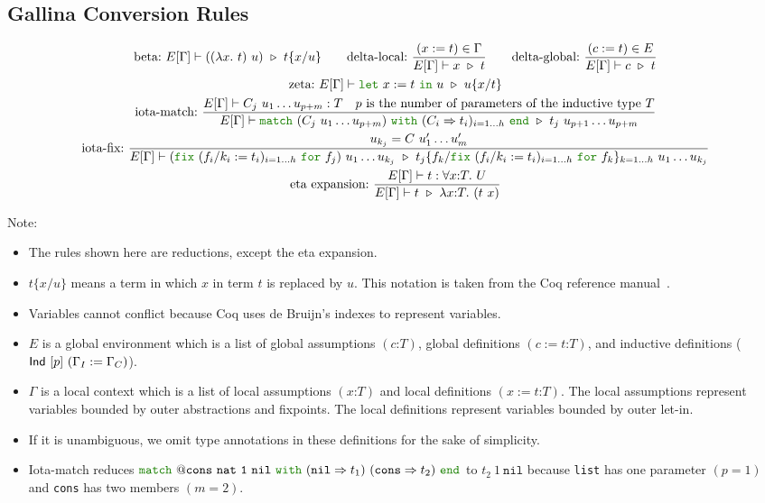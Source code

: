 \documentclass[a4paper,fleqn]{article}
\def\coq{\textrm{Coq}}
\def\gallina{\textrm{Gallina}}
\newcommand{\kwlet}{\mbox{\color{mygreen}\ttfamily let}}
\newcommand{\kwin}{\mbox{\color{mygreen}\ttfamily in}}
\newcommand{\kwmatch}{\mbox{\color{mygreen}\ttfamily match}}
\newcommand{\kwwith}{\mbox{\color{mygreen}\ttfamily with}}
\newcommand{\kwend}{\mbox{\color{mygreen}\ttfamily end}}
\newcommand{\kwfix}{\mbox{\color{mygreen}\ttfamily fix}}
\newcommand{\kwfor}{\mbox{\color{mygreen}\ttfamily for}}
\newcommand{\lam}[2]{\lambda #1.~#2}
\newcommand{\lamT}[3]{\lambda #1\mathord{:}#2.~#3}
\newcommand{\gassum}[2]{(#1\mathord{:}#2)}
\newcommand{\glodef}[3]{(#1:=#2\mathord{:}#3)}
\newcommand{\lassum}[2]{(#1\mathord{:}#2)}
\newcommand{\ldef}[3]{(#1:=#2\mathord{:}#3)}
\newcommand{\prodT}[3]{\forall #1\mathord{:}#2.~#3}
\newcommand{\letin}[3]{\kwlet~#1:=#2~\kwin~#3}
\newcommand{\match}[4]{\kwmatch~#1~\kwwith~(#2 \Rightarrow #3)_{#4}~\kwend}
\newcommand{\fix}[4]{\kwfix~(#1 := #2)_{#3}~\kwfor~#4}
\newcommand{\WT}[4]{\ensuremath{#1[#2] \vdash #3 : #4}}
\newcommand{\WTE}[3]{\WT{E}{#1}{#2}{#3}}
\newcommand{\WTEG}[2]{\WTE{\Gamma}{#1}{#2}}
\newcommand{\subst}[3]{#1\{#2/#3\}}
\begin{document}
\subsection{\gallina{} Conversion Rules}\label{sec:conversion-rules}

\begin{gather*}
  \text{beta:}~
    E[\Gamma] \vdash ((\lam{x}{t})~u)~\triangleright~\subst{t}{x}{u} \qquad
  \text{delta-local:}~
    \dfrac{(x:=t) \in \Gamma}{E[\Gamma] \vdash x~\triangleright~t} \qquad
  \text{delta-global:}~
    \dfrac{(c:=t) \in E}{E[\Gamma] \vdash c~\triangleright~t} \\
  \text{zeta:}~
    E[\Gamma] \vdash \letin{x}{t}{u}~\triangleright~\subst{u}{x}{t} \\
  \text{iota-match:}~
    \dfrac
    {
      E[\Gamma] \vdash C_j~u_1\ldots u_{p+m} : T \quad
      \text{$p$ is the number of parameters of the inductive type $T$}
    }{
      E[\Gamma] \vdash
      \match{(C_j~u_1\ldots u_{p+m})}{C_i}{t_i}{i=1\dots h}
      ~\triangleright~
      t_j~u_{p+1}\ldots u_{p+m}
    } \\
  \text{iota-fix:}~
    \dfrac{
      u_{k_j} = C~u'_1\ldots u'_m
    }{
      E[\Gamma] \vdash
      (\fix{f_i/k_i}{t_i}{i=1\dots h}{f_j})~u_1 \dots u_{k_j}
      ~\triangleright~
      \subst{t_j}{f_k}{\fix{f_i/k_i}{t_i}{i=1\dots h}{f_k}}_{k=1\dots h} ~u_1 \dots u_{k_j}} \\
  \text{eta expansion:}~
    \dfrac{\WTEG{t}{\prodT{x}{T}{U}}}{E[\Gamma] \vdash t~\triangleright~\lamT{x}{T}{(t~x)}}
\end{gather*}
\raggedright
{\small Note:
\begin{itemize}
  \item The rules shown here are reductions, except the eta expansion.
  \item $\subst{t}{x}{u}$ means a term in which $x$ in term $t$ is replaced by $u$.
    This notation is taken from the Coq reference manual~\cite{coqrefman8.12.0}.
  \item Variables cannot conflict because \coq{} uses de Bruijn's indexes to represent variables.
  \item $E$ is a global environment which is a list of
    global assumptions $\gassum{c}{T}$,
    global definitions $\glodef{c}{t}{T}$, and
    inductive definitions ($\text{\sf Ind}~[p]~(\Gamma_I := \Gamma_C)$).
  \item $\Gamma$ is a local context which is a list of
    local assumptions $\lassum{x}{T}$ and
    local definitions $\ldef{x}{t}{T}$.
    The local assumptions represent variables bounded by outer abstractions and fixpoints.
    The local definitions represent variables bounded by outer let-in.
  \item If it is unambiguous, we omit type annotations in these definitions for the sake of simplicity.
  \item Iota-match reduces $\kwmatch~\mathtt{@cons~nat~1~nil}~\kwwith~(\mathtt{nil} \Rightarrow t_1)~(\mathtt{cons} \Rightarrow t_2)~\kwend$ to $t_2~1~\mathtt{nil}$
    because \lstinline!list! has one parameter $(p=1)$ and \lstinline!cons! has two members $(m=2)$.
\end{itemize}}
\end{document}
